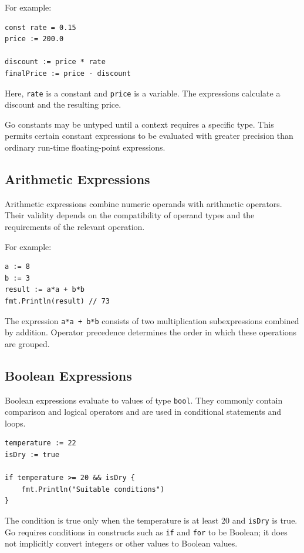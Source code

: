 For example:

\begin{lstlisting}
const rate = 0.15
price := 200.0

discount := price * rate
finalPrice := price - discount
\end{lstlisting}

Here, \texttt{rate} is a constant and \texttt{price} is a
variable. The expressions calculate a discount and the
resulting price.

Go constants may be untyped until a context requires a
specific type. This permits certain constant expressions
to be evaluated with greater precision than ordinary
run-time floating-point expressions.

\subsection{Arithmetic Expressions}

Arithmetic expressions combine numeric operands with
arithmetic operators. Their validity depends on the
compatibility of operand types and the requirements of
the relevant operation.

For example:

\begin{lstlisting}
a := 8
b := 3
result := a*a + b*b
fmt.Println(result) // 73
\end{lstlisting}

The expression \texttt{a*a + b*b} consists of two
multiplication subexpressions combined by addition.
Operator precedence determines the order in which these
operations are grouped.

\subsection{Boolean Expressions}

Boolean expressions evaluate to values of type \texttt{bool}.
They commonly contain comparison and logical operators and
are used in conditional statements and loops.

\begin{lstlisting}
temperature := 22
isDry := true

if temperature >= 20 && isDry {
    fmt.Println("Suitable conditions")
}
\end{lstlisting}

The condition is true only when the temperature is at least
20 and \texttt{isDry} is true. Go requires conditions in
constructs such as \texttt{if} and \texttt{for} to be Boolean;
it does not implicitly convert integers or other values to
Boolean values.

